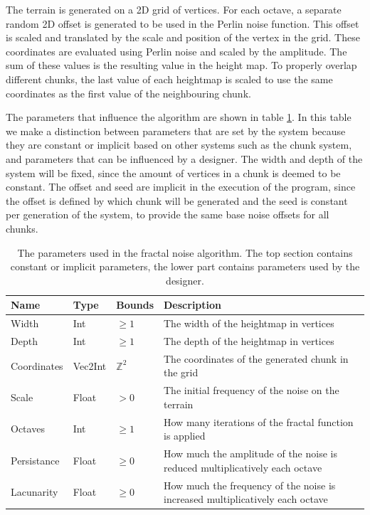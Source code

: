 The terrain is generated on a 2D grid of vertices. For each octave, a separate random 2D offset is generated to be used in the Perlin noise function. This offset is scaled and translated by the scale and position of the vertex in the grid. These coordinates are evaluated using Perlin noise and scaled by the amplitude. The sum of these values is the resulting value in the height map.
To properly overlap different chunks, the last value of each heightmap is scaled to use the same coordinates as the first value of the neighbouring chunk.

The parameters that influence the algorithm are shown in table \ref{tab:perlin-parameters}. In this table we make a distinction between parameters that are set by the system because they are constant or implicit based on other systems such as the chunk system, and parameters that can be influenced by a designer.
The width and depth of the system will be fixed, since the amount of vertices in a chunk is deemed to be constant. The offset and seed are implicit in the execution of the program, since the offset is defined by which chunk will be generated and the seed is constant per generation of the system, to provide the same base noise offsets for all chunks.

\begin{table}[h!]
\begin{tabularx}{\linewidth}{|l|l|l|X|}
\hline
Name & Type & Bounds & Description\\
\hline
Width & Int & $\geq 1$ & The width of the heightmap in vertices\\

Depth & Int & $\geq 1$ & The depth of the heightmap in vertices\\

Coordinates & Vec2Int & $\mathbb{Z}^2$ & The coordinates of the generated chunk in the grid\\

\hline

Scale & Float & $> 0$ & The initial frequency of the noise on the terrain\\

Octaves & Int & $\geq 1$ & How many iterations of the fractal function is applied\\

Persistance & Float & $\geq 0$ & How much the amplitude of the noise is reduced multiplicatively each octave \\

Lacunarity & Float & $\geq 0$ & How much the frequency of the noise is increased multiplicatively each octave \\
\hline

\end{tabularx}
\caption{The parameters used in the fractal noise algorithm. The top section contains constant or implicit parameters, the lower part contains parameters used by the designer.}
\label{tab:perlin-parameters}
\end{table}

